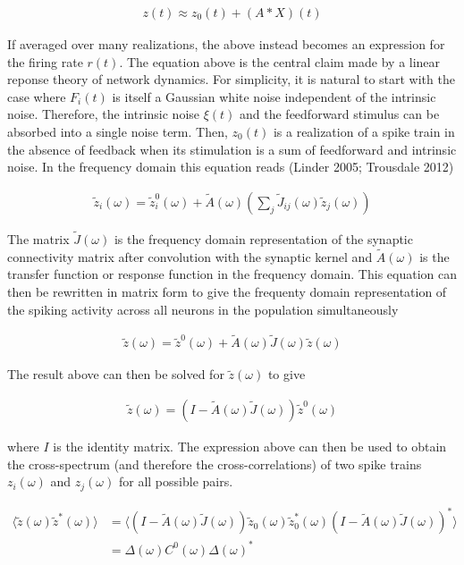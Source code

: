 \documentclass{ucetd}
\begin{document}
\begin{align}
z(t) \approx z_{0}(t) + (A * X)(t) 
\end{align}

If averaged over many realizations, the above instead becomes an expression for the firing rate $r(t)$. The equation above is the central claim made by a linear reponse theory of network dynamics. For simplicity, it is natural to start with the case where $F_{i}(t)$ is itself a Gaussian white noise independent of the intrinsic noise. Therefore, the intrinsic noise $\xi(t)$ and the feedforward stimulus can be absorbed into a single noise term. Then, $z_{0}(t)$ is a realization of a spike train in the absence of feedback when its stimulation is a sum of feedforward and intrinsic noise. In the frequency domain this equation reads (Linder 2005; Trousdale 2012)

\begin{align}
\tilde{z}_{i}(\omega) = \tilde{z}_{i}^{0}(\omega) + \tilde{A}(\omega)\left(\sum_{j}\tilde{J}_{ij}(\omega)\tilde{z}_{j}(\omega)\right)
\end{align}

The matrix $\tilde{J}(\omega)$ is the frequency domain representation of the synaptic connectivity matrix after convolution with the synaptic kernel and $\tilde{A}(\omega)$ is the transfer function or response function in the frequency domain. This equation can then be rewritten in matrix form to give the frequenty domain representation of the spiking activity across all neurons in the population simultaneously

\begin{align}
\tilde{z}(\omega) = \tilde{z}^{0}(\omega) + \tilde{A}(\omega)\tilde{J}(\omega)\tilde{z}(\omega)
\end{align}

The result above can then be solved for $\tilde{z}(\omega)$ to give 


\begin{align}
\tilde{z}(\omega) = \left(I-\tilde{A}(\omega)\tilde{J}(\omega)\right)\tilde{z}^{0}(\omega)
\end{align}

where $I$ is the identity matrix. The expression above can then be used to obtain the cross-spectrum (and therefore the cross-correlations) of two spike trains $z_{i}(\omega)$ and $z_{j}(\omega)$ for all possible pairs. 

\begin{align}
\langle\tilde{z}(\omega)\tilde{z}^{*}(\omega)\rangle &= \langle \left(I-\tilde{A}(\omega)\tilde{J}(\omega)\right)\tilde{z}_{0}(\omega)\tilde{z}_{0}^{*}(\omega)\left(I-\tilde{A}(\omega)\tilde{J}(\omega)\right)^{*}\rangle\\
&= \Delta(\omega)C^{0}(\omega)\Delta(\omega)^{*}
\end{align}
\end{document}
